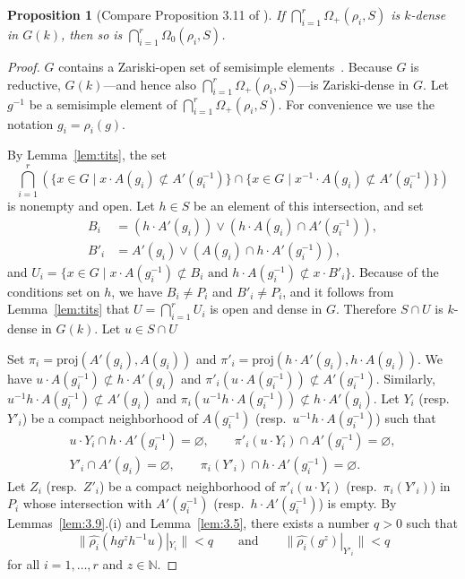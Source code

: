 \documentclass{amsart}
\theoremstyle{plain}
\newtheorem{proposition}[theorem]{Proposition}
\theoremstyle{definition}
\theoremstyle{remark}
\providecommand{\norm}[1]{\lVert#1\rVert}
\begin{document}
\begin{proposition}[Compare Proposition 3.11 of \cite{MR44:4105}]\label{prop:veryprox}
If $\bigcap_{i = 1}^{r} \Omega_{+}(\rho_{i}, S)$ is $k$-dense in $G(k)$, then so is
$\bigcap_{i = 1}^{r} \Omega_{0}(\rho_{i}, S)$.
\end{proposition}
\begin{proof}
$G$ contains a Zariski-open set of semisimple elements~\cite{MR0180554}. Because $G$ is
reductive, $G(k)$---and hence also $\bigcap_{i = 1}^{r} \Omega_{+}(\rho_{i}, S)$---is Zariski-dense in $G$. Let
$g^{-1}$ be a semisimple element of $\bigcap_{i = 1}^{r} \Omega_{+}(\rho_{i}, S)$. For
convenience we use the notation $g_{i} = \rho_{i}(g)$.

By
Lemma~\ref{lem:tits}, the set
$$\bigcap_{i = 1}^{r}\left(\{x \in G \mid x \cdot A(g_{i}) \not\subset A'(g_{i}^{-1})\} \cap \{x
\in G \mid x^{-1} \cdot A(g_{i}) \not\subset A'(g_{i}^{-1}) \}\right)$$
is nonempty and open.
Let $h \in S$ be an element of this intersection, and set
\begin{align*}
B_{i} &= (h\cdot A'(g_{i})) \vee (h\cdot A(g_{i})\cap A'(g_{i}^{-1})),\\
B'_{i} &= A'(g_{i}) \vee (A(g_{i}) \cap h \cdot A'(g_{i}^{-1})),
\end{align*}
and $U_{i} = \{x \in G \mid x\cdot A(g_{i}^{-1}) \not\subset B_{i}\text{ and } h\cdot
A(g_{i}^{-1}) \not\subset x\cdot B'_{i}\}$.
Because of the conditions set on $h$, we have $B_{i} \neq P_{i}$ and $B'_{i} \neq
P_{i}$, and it follows from Lemma~\ref{lem:tits} that $U = \bigcap_{i = 1}^{r} U_{i}$
is open and dense in $G$. Therefore $S \cap U$ is $k$-dense in $G(k)$. Let $u \in S \cap U$

Set $\pi_{i} = \mathrm{proj}(A'({g_{i}}), A(g_{i}))$ and
$\pi'_{i} = \mathrm{proj}(h\cdot A'({g_{i}}), h\cdot A(g_{i}))$. We have
$u \cdot A(g_{i}^{-1}) \not\subset h \cdot A'(g_{i})$ and $\pi'_{i}(u\cdot A(g_{i}^{-1})) \not\subset
A'(g_{i}^{-1})$. Similarly, $u^{-1}h\cdot A(g_{i}^{-1}) \not\subset A'(g_{i})$ and
$\pi_{i}(u^{-1}h\cdot A(g_{i}^{-1})) \not\subset h\cdot A'(g_{i})$. Let $Y_{i}$ (resp.\  $Y'_{i}$)
be a compact neighborhood of $A(g_{i}^{-1})$ (resp.\  $u^{-1}h\cdot A(g_{i}^{-1})$) such
that 
\begin{gather*}
u\cdot Y_{i} \cap h \cdot A'(g_{i}^{-1}) = \varnothing, \qquad
\pi'_{i}(u\cdot Y_{i}) \cap A'(g_{i}^{-1}) = \varnothing,\\
Y'_{i} \cap A'(g_{i})
= \varnothing, \qquad \pi_{i}(Y'_{i})\cap h\cdot A'(g_{i}^{-1}) = \varnothing.
\end{gather*}
Let $Z_{i}$ (resp.\  $Z'_{i}$) be a compact neighborhood of $\pi'_{i}(u\cdot Y_{i})$ (resp.\ 
$\pi_{i}(Y'_{i})$) in $P_{i}$ whose intersection with $A'(g_{i}^{-1})$ (resp.\  $h\cdot
A'(g_{i}^{-1})$) is empty. By Lemmas~\ref{lem:3.9}.(i) and Lemma~\ref{lem:3.5}, there
exists a number $q > 0$ such that
$$\norm{\widehat{\rho_{i}}(hg^{z}h^{-1}u)|_{Y_{i}}} < q\qquad \text{and}\qquad
\norm{\widehat{\rho_{i}}(g^{z})|_{Y'_{i}}} < q$$
for all $i = 1,\ldots, r$ and $z \in \mathbb{N}$.


\end{proof}
\end{document}
